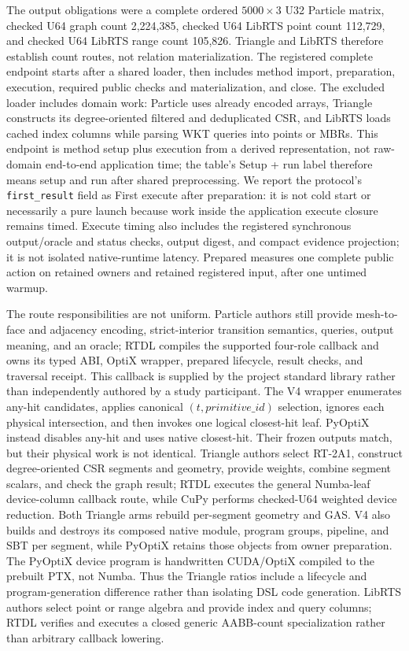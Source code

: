 The output obligations were a complete ordered $5000\mathbin{\times}3$ U32
Particle matrix, checked U64 graph count 2,224,385, checked U64 LibRTS point
count 112,729, and checked U64 LibRTS range count 105,826.  Triangle and LibRTS
therefore establish count routes, not relation materialization.  The registered
complete endpoint starts after a shared loader, then includes method import,
preparation, execution, required public checks and materialization, and close.
The excluded loader includes domain work: Particle uses already encoded arrays,
Triangle constructs its degree-oriented filtered and deduplicated CSR, and
LibRTS loads cached index columns while parsing WKT queries into points or MBRs.
This endpoint is method setup plus execution from a derived representation, not
raw-domain end-to-end application time; the table's Setup + run label therefore
means setup and run after shared preprocessing.  We report the protocol's
\texttt{first\_result} field as First execute after preparation: it is not cold
start or necessarily a pure launch because work inside the application execute
closure remains timed.  Execute timing also includes the registered synchronous
output/oracle and status checks, output digest, and compact evidence projection;
it is not isolated native-runtime latency.  Prepared measures one
complete public action on retained owners and retained registered input, after
one untimed warmup.

The route responsibilities are not uniform.  Particle authors still provide
mesh-to-face and adjacency encoding, strict-interior transition semantics,
queries, output meaning, and an oracle; RTDL compiles the supported four-role
callback and owns its typed ABI, OptiX wrapper, prepared lifecycle, result
checks, and traversal receipt.  This callback is supplied by the project
standard library rather than independently authored by a study participant.
The V4 wrapper enumerates any-hit candidates,
applies canonical $(t,\mathit{primitive\_id})$ selection, ignores each physical
intersection, and then invokes one logical closest-hit leaf.  PyOptiX instead
disables any-hit and uses native closest-hit.  Their frozen outputs match, but
their physical work is not identical.  Triangle authors select RT-2A1, construct
degree-oriented CSR segments and geometry, provide weights, combine segment
scalars, and check the graph result; RTDL executes the general Numba-leaf
device-column callback route, while CuPy performs checked-U64 weighted device
reduction.  Both Triangle arms rebuild per-segment geometry and GAS.  V4 also
builds and destroys its composed native module, program groups, pipeline, and
SBT per segment, while PyOptiX retains those objects from owner preparation.  The
PyOptiX device program is handwritten CUDA/OptiX compiled to the prebuilt PTX,
not Numba.  Thus the Triangle ratios include a lifecycle and program-generation
difference rather than isolating DSL code generation.  LibRTS authors select
point or range algebra and provide index and
query columns; RTDL verifies and executes a closed generic AABB-count
specialization rather than arbitrary callback lowering.


